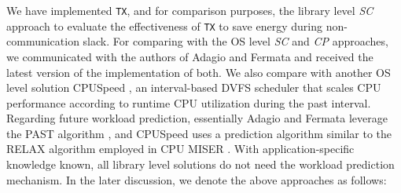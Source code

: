 \documentclass[12pt]{elsarticle}
\begin{document}
\begin{comment}
We have implemented all three approaches for energy efficient distributed Cholesky factorization to evaluate the advantages of the \emph{TDS} approach over the na\"{\i}ve approach and the \emph{CP} approach. Our implementation was accomplished by rewriting the \textsf{pdpotrf()} routine provided by ScaLAPACK \cite{scalapack} and DPLASMA \cite{dplasma}, two widely employed high performance and scalable numerical linear algebra libraries for distributed-memory multicore architectures. For achieving optimal performance of computation, we employ the \textsf{dsyrk()}, \textsf{dpotrf()}, and \textsf{dtrsm()} routines provided by LAPACK \cite{lapack}, the core linear algebra library called by ScaLAPACK under the hood. We improve communication performance by leveraging high performance pipeline broadcast with tuned chunk size \cite{ccgrid14}. The rewritten \textsf{pdpotrf()} has the same interface and is able to produce the same results as the original \textsf{pdpotrf()} of ScaLAPACK and DPLASMA, with total normalized differences between the range of  and  in our experiments.

Our goal of the evaluation is to experimentally observe that compared to the two classic approaches, the optimal energy efficiency can be achieved using our \emph{TDS} approach for task-parallel algorithms and applications running on distributed-memory clusters such as distributed Cholesky factorization. Meanwhile, the two classic approaches are widely used due to the advantage of minor performance loss to the original application. We evaluate our \emph{TDS} approach that it also incurs negligible performance loss. Moreover, we also evaluate energy efficiency of our implementation of \textsf{pdpotrf()} against ScaLAPACK and DPLASMA \textsf{pdpotrf()} routines with similar performance.
\end{comment}

We have implemented \texttt{TX}, and for comparison purposes, the library level \emph{SC} approach to evaluate the effectiveness of \texttt{TX} to save energy during non-communication slack. For comparing with the OS level \emph{SC} and \emph{CP} approaches, we communicated with the authors of Adagio \cite{ics09} and Fermata \cite{sc07} and received the latest version of the implementation of both. We also compare with another OS level solution CPUSpeed \cite{cpuspeed}, an interval-based DVFS scheduler that scales CPU performance according to runtime CPU utilization during the past interval. Regarding future workload prediction, essentially Adagio and Fermata leverage the PAST algorithm \cite{osdi94}, and CPUSpeed uses a prediction algorithm similar to the RELAX algorithm employed in CPU MISER \cite{icpp07}. With application-specific knowledge known, all library level solutions do not need the workload prediction mechanism. In the later discussion, we denote the above approaches as follows:
\end{document}
